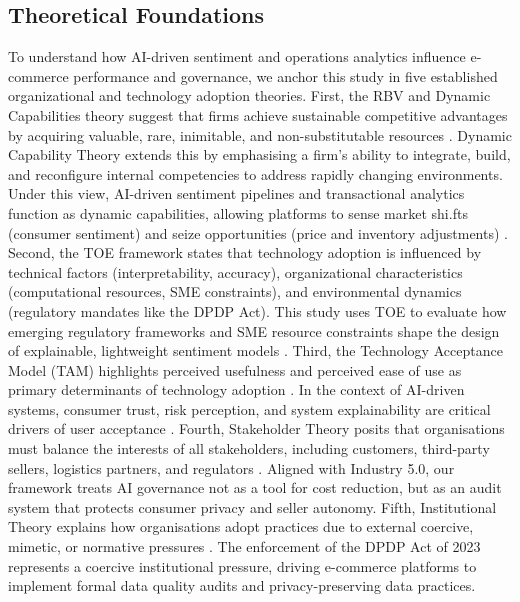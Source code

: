\documentclass[authoryear,review,3p,times,12pt]{elsarticle}
\begin{document}
\subsection{Theoretical Foundations}
To understand how AI-driven sentiment and operations analytics influence e-commerce performance and governance, we anchor this study in five established organizational and technology adoption theories. First, the RBV and Dynamic Capabilities theory suggest that firms achieve sustainable competitive advantages by acquiring valuable, rare, inimitable, and non-substitutable resources \citep{barney1991firm}. Dynamic Capability Theory extends this by emphasising a firm's ability to integrate, build, and reconfigure internal competencies to address rapidly changing environments. Under this view, AI-driven sentiment pipelines and transactional analytics function as dynamic capabilities, allowing platforms to sense market shi.fts (consumer sentiment) and seize opportunities (price and inventory adjustments) \citep{RAHMAN2026100020, patgiri2026artificial, chen2022impact}. Second, the TOE framework \citep{tornatzky1990processes} states that technology adoption is influenced by technical factors (interpretability, accuracy), organizational characteristics (computational resources, SME constraints), and environmental dynamics (regulatory mandates like the DPDP Act). This study uses TOE to evaluate how emerging regulatory frameworks and SME resource constraints shape the design of explainable, lightweight sentiment models \citep{zhu2026ai}. Third, the Technology Acceptance Model (TAM) highlights perceived usefulness and perceived ease of use as primary determinants of technology adoption \citep{davis1989user}. In the context of AI-driven systems, consumer trust, risk perception, and system explainability are critical drivers of user acceptance \citep{patgiri2026artificial,zhu2026ai, phan2025ai_trust}. Fourth, Stakeholder Theory posits that organisations must balance the interests of all stakeholders, including customers, third-party sellers, logistics partners, and regulators \citep{MAHAJAN2023114104}. Aligned with Industry 5.0, our framework treats AI governance not as a tool for cost reduction, but as an audit system that protects consumer privacy and seller autonomy. Fifth, Institutional Theory explains how organisations adopt practices due to external coercive, mimetic, or normative pressures \citep{hirsch1975organizational}. The enforcement of the DPDP Act of 2023 represents a coercive institutional pressure, driving e-commerce platforms to implement formal data quality audits and privacy-preserving data practices.
\end{document}
